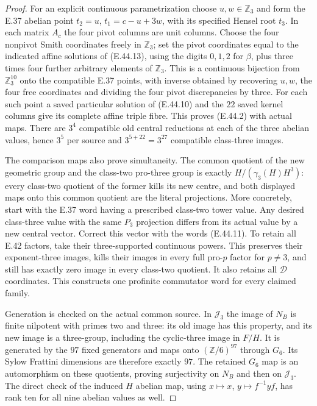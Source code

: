 \begin{proof}
For an explicit continuous parametrization choose
$u,w\in\mathbb Z_3$ and form the E.37 abelian point
$t_2=u$, $t_1=c-u+3w$, with its specified Hensel root
$t_3$.  In each matrix $A_c$ the four pivot columns
are unit columns.  Choose the four nonpivot Smith
coordinates freely in $\mathbb Z_3$; set the pivot
coordinates equal to the indicated affine solutions
of \textup{(E.44.13)}, using the digits $0,1,2$
for $\beta$, plus three times four further arbitrary
elements of $\mathbb Z_3$.
This is a continuous bijection from $\mathbb Z_3^{10}$
onto the compatible E.37 points, with inverse obtained
by recovering $u,w$, the four free coordinates and
dividing the four pivot discrepancies by three.
For each such point a saved particular solution of
\textup{(E.44.10)} and the $22$ saved kernel columns
give its complete affine triple fibre.
This proves \textup{(E.44.2)} with actual maps.
There are $3^4$ compatible old central reductions
at each of the three abelian values, hence $3^5$
per source and $3^{5+22}=3^{27}$ compatible
class-three images.

The comparison maps also prove simultaneity.
The common quotient of the new geometric group
and the class-two pro-three group is exactly
$H/(\gamma_3(H)H^3)$: every class-two quotient
of the former kills its new centre, and both
displayed maps onto this common quotient are
the literal projections.
More concretely, start with the E.37 word having
a prescribed class-two tower value.  Any desired
class-three value with the same $P_3$ projection
differs from its actual value by a new central
vector.  Correct this vector with the words
\textup{(E.44.11)}.  To retain all E.42 factors,
take their three-supported continuous powers.
This preserves their exponent-three images,
kills their images in every full pro-$p$ factor
for $p\ne3$, and still has exactly zero image in
every class-two quotient.  It also retains all
$\mathscr D$ coordinates.  This constructs one
profinite commutator word for every claimed family.

Generation is checked on the actual common source.
In $\mathcal J_3$ the image of $N_B$ is finite
nilpotent with primes two and three: its old image
has this property, and its new image is a
three-group, including the cyclic-three image in
$F/H$.  It is generated by the $97$ fixed
generators and maps onto $(\mathbb Z/6)^{97}$
through $G_6$.  Its Sylow Frattini dimensions are
therefore exactly $97$.  The retained $G_6$ map
is an automorphism on these quotients, proving
surjectivity on $N_B$ and then on $\mathcal J_3$.
The direct check of the induced $H$ abelian map,
using $x\mapsto x$, $y\mapsto f^{-1}yf$, has
rank ten for all nine abelian values as well.


\end{proof}
